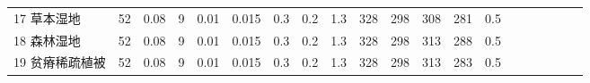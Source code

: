\begin{landscape}
\begin{table}[htbp]
\begin{tabular}{@{}lccccccccccccccccccc@{}}
    17 草本湿地    & 52                                                                & 0.08                                                                                                   & 9                                                                                  & 0.01                                                                               & 0.015                                                               & 0.3                                                       & 0.2                                                       & 1.3                                                       & 328                                                             & 298                                                             & 308                                                              & 281                                                               & 0.5                                                          \\
    18 森林湿地    & 52                                                                & 0.08                                                                                                   & 9                                                                                  & 0.01                                                                               & 0.015                                                               & 0.3                                                       & 0.2                                                       & 1.3                                                       & 328                                                             & 298                                                             & 313                                                              & 288                                                               & 0.5                                                          \\
    19 贫瘠稀疏植被  & 52                                                                & 0.08                                                                                                   & 9                                                                                  & 0.01                                                                               & 0.015                                                               & 0.3                                                       & 0.2                                                       & 1.3                                                       & 328                                                             & 298                                                             & 313                                                              & 283                                                               & 0.5                                                          \\

\end{tabular}
\end{table}
\end{landscape}

